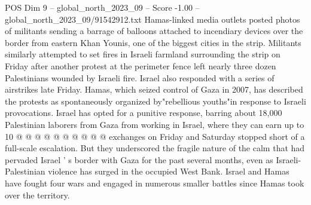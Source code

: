 \begin{textsample}{POS Dim 9 – global\_north\_2023\_09 – Score -1.00 – global\_north\_2023\_09/91542912.txt}
Hamas-linked media outlets posted photos of militants sending a barrage of balloons attached to incendiary devices over the border from eastern Khan Younis, one of the biggest cities in the strip.
Militants similarly attempted to set fires in Israeli farmland surrounding the strip on Friday after another protest at the perimeter fence left nearly three dozen Palestinians wounded by Israeli fire.
Israel also responded with a series of airstrikes late Friday.
Hamas, which seized control of Gaza in 2007, has described the protests as spontaneously organized by"rebellious youths"in response to Israeli provocations.
Israel has opted for a punitive response, barring about 18,000 Palestinian laborers from Gaza from working in Israel, where they can earn up to 10 @ @ @ @ @ @ @ @ @ @ exchanges on Friday and Saturday stopped short of a full-scale escalation.
But they underscored the fragile nature of the calm that had pervaded Israel ' s border with Gaza for the past several months, even as Israeli-Palestinian violence has surged in the occupied West Bank.
Israel and Hamas have fought four wars and engaged in numerous smaller battles since Hamas took over the territory.

\end{textsample}
